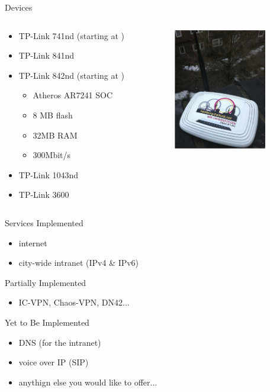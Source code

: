 \documentclass[c]{beamer}
\begin{document}
\begin{frame}{Devices}
	\begin{columns}[c]
		\begin{column}{0.5\textwidth}
			\begin{itemize}
				\item TP-Link 741nd (starting at )
				\item TP-Link 841nd
				\item TP-Link 842nd (starting at )
				\begin{itemize}
					\item Atheros AR7241 SOC
					\item 8 MB flash	
					\item 32MB RAM
					\item 300Mbit/s
				\end{itemize}
				\item TP-Link 1043nd
				\item TP-Link 3600
			\end{itemize}
		\end{column}
		\begin{column}{0.5\textwidth}
			\begin{center}
				\includegraphics[height=150pt]{741nd}
			\end{center}
		\end{column}
	\end{columns}
\end{frame}


\begin{frame}{Services}
	Implemented
	\begin{itemize}
		\item internet
		\item city-wide intranet (IPv4 \& IPv6)
	\end{itemize}
	Partially Implemented
	\begin{itemize}
		\item IC-VPN, Chaos-VPN, DN42... 
	\end{itemize}
	Yet to Be Implemented
	\begin{itemize}
		\item DNS (for the intranet)
		\item voice over IP (SIP)
		\item anythign else you would like to offer...
	\end{itemize}
\end{frame}
\end{document}
